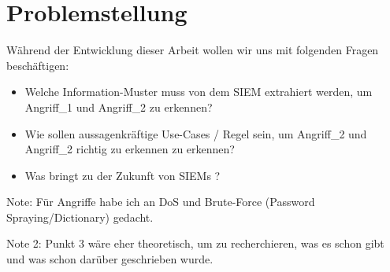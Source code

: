 \section{Problemstellung}

Während der Entwicklung dieser Arbeit wollen wir uns mit folgenden Fragen beschäftigen:

\begin{itemize}
   \item Welche Information-Muster muss von dem \gls{SIEM} extrahiert werden, um Angriff\_1 und Angriff\_2 zu erkennen?
   \item Wie sollen aussagenkräftige Use-Cases / Regel sein, um Angriff\_2 und Angriff\_2 richtig zu erkennen zu erkennen?
   \item Was bringt  zu der Zukunft von \glspl{SIEM} ?
\end{itemize}

Note: Für Angriffe habe ich an DoS und Brute-Force (Password Spraying/Dictionary) gedacht.

Note 2: Punkt 3 wäre eher theoretisch, um zu recherchieren, was es schon gibt und was schon darüber geschrieben wurde.

